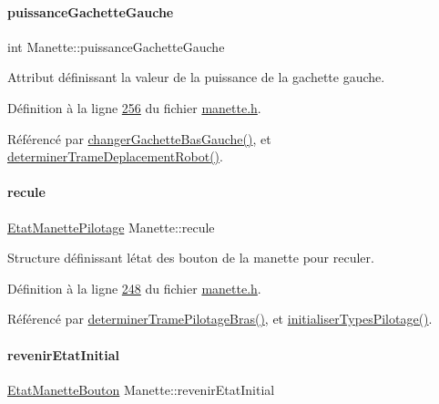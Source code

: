\paragraph{\texorpdfstring{puissance\+Gachette\+Gauche}{puissanceGachetteGauche}}
{\footnotesize\ttfamily int Manette\+::puissance\+Gachette\+Gauche\hspace{0.3cm}{\ttfamily [private]}}



Attribut définissant la valeur de la puissance de la gachette gauche. 



Définition à la ligne \hyperlink{manette_8h_source_l00256}{256} du fichier \hyperlink{manette_8h_source}{manette.\+h}.



Référencé par \hyperlink{manette_8cpp_source_l00493}{changer\+Gachette\+Bas\+Gauche()}, et \hyperlink{manette_8cpp_source_l00341}{determiner\+Trame\+Deplacement\+Robot()}.

\mbox{\label{class_manette_a5ed3a0ab27f98cd11ecafe5f5b94e7e5}} 
\paragraph{\texorpdfstring{recule}{recule}}
{\footnotesize\ttfamily \hyperlink{struct_etat_manette_pilotage}{Etat\+Manette\+Pilotage} Manette\+::recule\hspace{0.3cm}{\ttfamily [private]}}



Structure définissant l\textquotesingle{}état des bouton de la manette pour reculer. 



Définition à la ligne \hyperlink{manette_8h_source_l00248}{248} du fichier \hyperlink{manette_8h_source}{manette.\+h}.



Référencé par \hyperlink{manette_8cpp_source_l00375}{determiner\+Trame\+Pilotage\+Bras()}, et \hyperlink{manette_8cpp_source_l00040}{initialiser\+Types\+Pilotage()}.

\mbox{\label{class_manette_a4c0e9611f08e363feb0a24f8c9d258f2}} 
\paragraph{\texorpdfstring{revenir\+Etat\+Initial}{revenirEtatInitial}}
{\footnotesize\ttfamily \hyperlink{struct_etat_manette_bouton}{Etat\+Manette\+Bouton} Manette\+::revenir\+Etat\+Initial\hspace{0.3cm}{\ttfamily [private]}}




